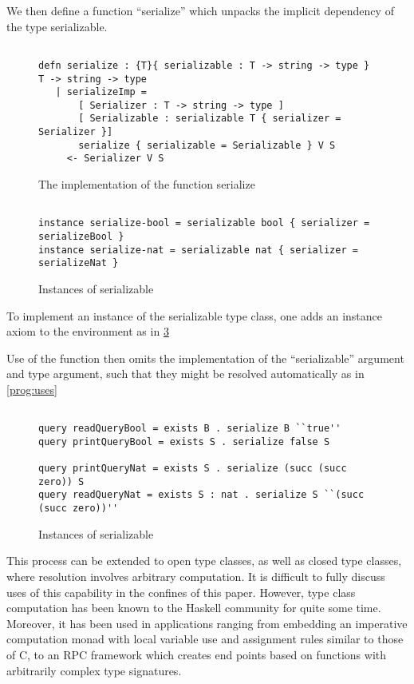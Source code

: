 We then define a function ``serialize'' which unpacks the implicit dependency of the type serializable.


\begin{figure}[H]
\begin{lstlisting}

defn serialize : {T}{ serializable : T -> string -> type } T -> string -> type
   | serializeImp = 
       [ Serializer : T -> string -> type ]
       [ Serializable : serializable T { serializer = Serializer }]
       serialize { serializable = Serializable } V S
     <- Serializer V S

\end{lstlisting}
\caption{The implementation of the function serialize }
\label{prog:imp}
\end{figure}


\begin{figure}[H]
\begin{lstlisting}

instance serialize-bool = serializable bool { serializer = serializeBool }
instance serialize-nat = serializable nat { serializer = serializeNat }

\end{lstlisting}
\caption{ Instances of serializable }
\label{prog:inst}
\end{figure}


To implement an instance of the serializable type class, one adds an instance axiom to the environment as in \ref{prog:inst}

Use of the function then omits the implementation of the ``serializable'' argument and type argument, such that they might be resolved automatically as in \ref{prog:uses}


\begin{figure}[H]
\begin{lstlisting}

query readQueryBool = exists B . serialize B ``true''
query printQueryBool = exists S . serialize false S

query printQueryNat = exists S . serialize (succ (succ zero)) S
query readQueryNat = exists S : nat . serialize S ``(succ (succ zero))''

\end{lstlisting}
\caption{ Instances of serializable }
\label{prog:inst}
\end{figure}


This process can be extended to open type classes, as well as closed type classes, where 
resolution involves arbitrary computation.  
It is difficult to fully discuss uses of this capability in the confines of this paper. However,
type class computation has been known to the Haskell community for quite some time. Moreover, it 
has been used in applications ranging from embedding an imperative computation monad with local variable use and 
assignment rules similar to those of C, to an RPC framework which creates end points based on functions with arbitrarily complex type signatures.

